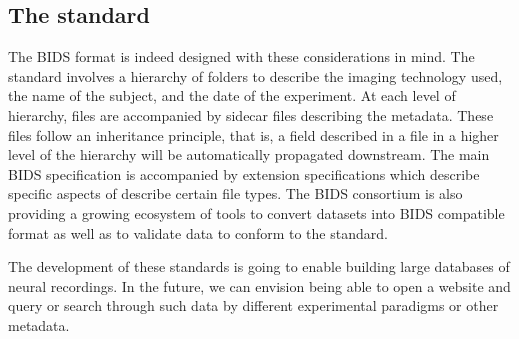 \subsection{The standard}
The BIDS format is indeed designed with these considerations in mind. The standard involves a hierarchy of folders to describe the imaging technology used, the name of the subject, and the date of the experiment. At each level of hierarchy, files are accompanied by sidecar  files describing the metadata. These files follow an inheritance principle, that is, a field described in a  file in a higher level of the hierarchy will be automatically propagated downstream. The main BIDS specification is accompanied by extension specifications which describe specific aspects of describe certain file types. The BIDS consortium is also providing a growing ecosystem of tools to convert datasets into BIDS compatible format as well as to validate data to conform to the standard. 

The development of these standards is going to enable building large databases of neural recordings. In the future, we can envision being able to open a website and query or search through such data by different experimental paradigms or other metadata.

\noindent{}%

